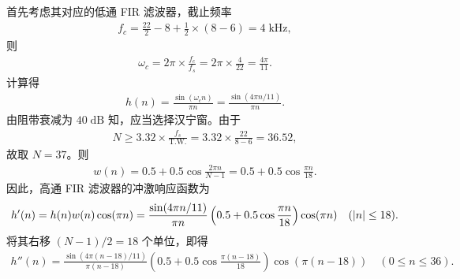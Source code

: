 \begin{solution}
    首先考虑其对应的低通 FIR 滤波器，截止频率
    \begin{align*}
        f_c = \frac{22}{2} - 8 + \frac{1}{2} \times (8 - 6) = 4\;\mathrm{kHz},
    \end{align*}
    则
    \begin{align*}
        \omega_c = 2\pi \times \frac{f_c}{f_s} = 2\pi \times \frac{4}{22} = \frac{4\pi}{11}.
    \end{align*}
    计算得
    \begin{align*}
        h(n) = \frac{\sin(\omega_c n)}{\pi n} = \frac{\sin(4\pi n / 11)}{\pi n}.
    \end{align*}
    由阻带衰减为 $40\;\mathrm{dB}$ 知，应当选择汉宁窗。由于
    \begin{align*}
        N \ge 3.32 \times \frac{f_s}{\text{T.W.}} = 3.32 \times \frac{22}{8 - 6} = 36.52,
    \end{align*}
    故取 $N = 37$。则
    \begin{align*}
        w(n) = 0.5 + 0.5\cos\frac{2\pi n}{N - 1} = 0.5 + 0.5\cos\frac{\pi n}{18}.
    \end{align*}
    因此，高通 FIR 滤波器的冲激响应函数为
    \begin{align*}
        h'(n) = h(n) w(n) \cos(\pi n) = \frac{\sin(4\pi n / 11)}{\pi n} \left(0.5 + 0.5\cos\frac{\pi n}{18}\right) \cos(\pi n) \quad (\left|n\right| \le 18).
    \end{align*}
    将其右移 $(N - 1) / 2 = 18$ 个单位，即得
    \begin{align*}
        h''(n) = \frac{\sin(4\pi (n - 18) / 11)}{\pi (n - 18)} \left(0.5 + 0.5\cos\frac{\pi (n - 18)}{18}\right) \cos(\pi (n - 18)) \quad (0 \le n \le 36).
    \end{align*}
\end{solution}

